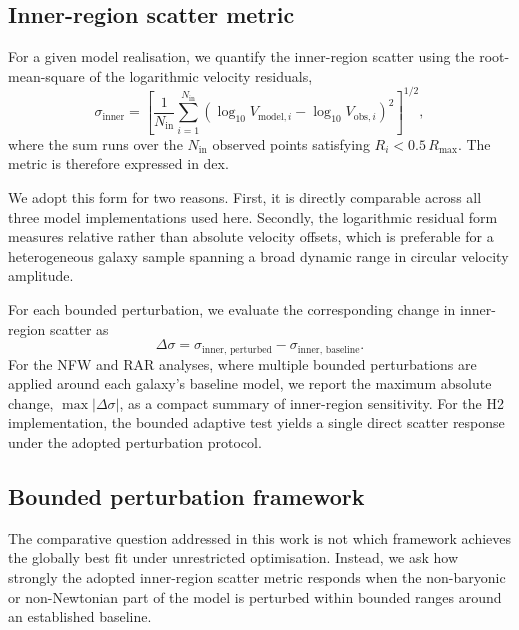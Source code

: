 \documentclass[fleqn,usenatbib]{mnras}
\begin{document}
\subsection{Inner-region scatter metric}
\label{subsec:scatter_metric}

For a given model realisation, we quantify the inner-region scatter
using the root-mean-square of the logarithmic velocity residuals,
\begin{equation}
	\sigma_{\mathrm{inner}}
	=
	\left[
	\frac{1}{N_{\mathrm{in}}}
	\sum_{i=1}^{N_{\mathrm{in}}}
	\left(
	\log_{10} V_{\mathrm{model},i}
	-
	\log_{10} V_{\mathrm{obs},i}
	\right)^2
	\right]^{1/2},
\end{equation}
where the sum runs over the $N_{\mathrm{in}}$ observed points satisfying
$R_i < 0.5\,R_{\max}$. The metric is therefore expressed in dex.

We adopt this form for two reasons. First, it is directly comparable
across all three model implementations used here. Secondly, the
logarithmic residual form measures relative rather than absolute
velocity offsets, which is preferable for a heterogeneous galaxy sample
spanning a broad dynamic range in circular velocity amplitude.

For each bounded perturbation, we evaluate the corresponding change in
inner-region scatter as
\begin{equation}
	\Delta \sigma
	=
	\sigma_{\mathrm{inner,\,perturbed}}
	-
	\sigma_{\mathrm{inner,\,baseline}}.
\end{equation}
For the NFW and RAR analyses, where multiple bounded perturbations are
applied around each galaxy's baseline model, we report the maximum 
absolute change, $\max |\Delta \sigma|$, as a compact summary of 
inner-region sensitivity. For the H2 implementation, the bounded 
adaptive test yields a single direct scatter response under the 
adopted perturbation protocol.

\subsection{Bounded perturbation framework}
\label{subsec:bounded_framework}

The comparative question addressed in this work is not which framework
achieves the globally best fit under unrestricted optimisation. Instead,
we ask how strongly the adopted inner-region scatter metric responds
when the non-baryonic or non-Newtonian part of the model is perturbed
within bounded ranges around an established baseline.
\end{document}
